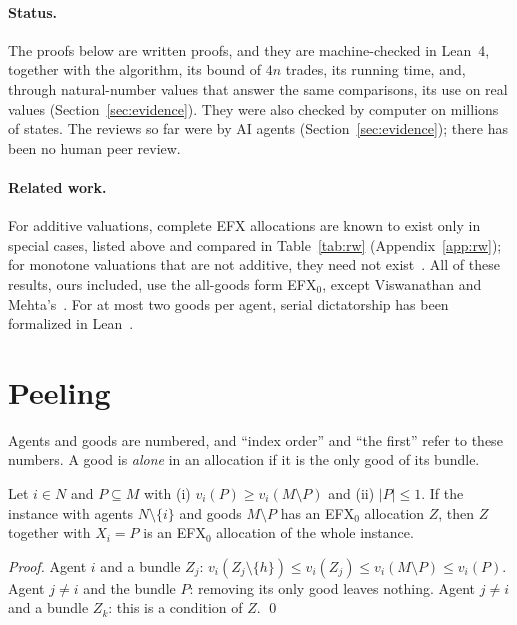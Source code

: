 \documentclass[runningheads,11pt]{llncs}
\newcommand{\efxz}{\texorpdfstring{\mbox{EFX$_0$}}{EFX0}}
\begin{document}
\paragraph{Status.} The proofs below are written proofs, and they are machine-checked in Lean~4, together with the algorithm, its bound of $4n$ trades, its running time, and, through natural-number values that answer the same comparisons, its use on real values (Section~\ref{sec:evidence}). They were also checked by computer on millions of states. The reviews so far were by AI agents (Section~\ref{sec:evidence}); there has been no human peer review.

\paragraph{Related work.} For additive valuations, complete EFX allocations are known to exist only in special cases, listed above and compared in Table~\ref{tab:rw} (Appendix~\ref{app:rw}); for monotone valuations that are not additive, they need not exist~\cite{AkramiMMSW26,MackenzieS26}. All of these results, ours included, use the all-goods form \efxz{}, except Viswanathan and Mehta's~\cite{ViswanathanM24}. For at most two goods per agent, serial dictatorship has been formalized in Lean~\cite{MrdEfx}.

\section{Peeling}\label{sec:peel}

Agents and goods are numbered, and ``index order'' and ``the first'' refer to these numbers. A good is \emph{alone} in an allocation if it is the only good of its bundle.

\begin{lemma}[peeling]\label{lem:peel}
Let $i\in N$ and $P\subseteq M$ with (i) $v_i(P)\ge v_i(M\setminus P)$ and (ii) $|P|\le1$. If the instance with agents $N\setminus\{i\}$ and goods $M\setminus P$ has an \efxz{} allocation $Z$, then $Z$ together with $X_i=P$ is an \efxz{} allocation of the whole instance.
\end{lemma}

\begin{proof}
Agent $i$ and a bundle $Z_j$: $v_i(Z_j\setminus\{h\})\le v_i(Z_j)\le v_i(M\setminus P)\le v_i(P)$. Agent $j\ne i$ and the bundle $P$: removing its only good leaves nothing. Agent $j\ne i$ and a bundle $Z_k$: this is a condition of $Z$. \qed
\end{proof}
\end{document}
